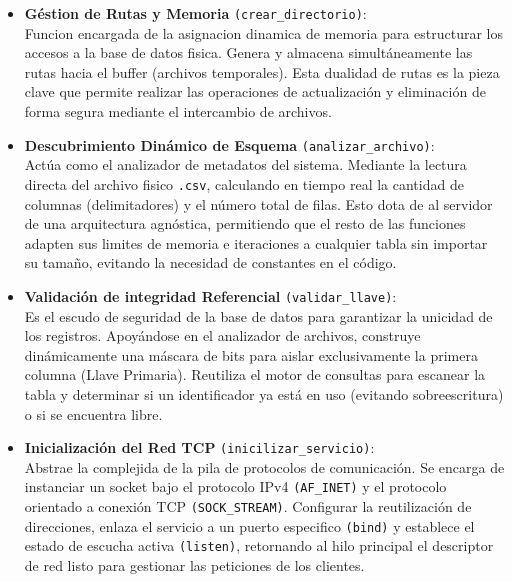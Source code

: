 \documentclass[12pt]{article}
\begin{document}
\begin{itemize}
    \item \textbf{Géstion de Rutas y Memoria} \texttt{(crear\_directorio)}: \\
    Funcion encargada de la asignacion dinamica de memoria para estructurar los accesos a la base de datos fisica. Genera y almacena simultáneamente las rutas hacia el buffer (archivos temporales). Esta dualidad de rutas es la pieza clave que permite realizar las operaciones de actualización y eliminación de forma segura mediante el intercambio de archivos.
    \item \textbf{Descubrimiento Dinámico de Esquema} \texttt{(analizar\_archivo)}:\\
    Actúa como el analizador de metadatos del sistema. Mediante la lectura directa del archivo fisico \texttt{.csv}, calculando en tiempo real la cantidad de columnas (delimitadores) y el número total de filas. Esto dota de al servidor de una arquitectura agnóstica, permitiendo que el resto de las funciones adapten sus limites de memoria e iteraciones a cualquier tabla sin importar su tamaño, evitando la necesidad de constantes en el código.
    \item \textbf{Validación de integridad Referencial} \texttt{(validar\_llave)}: \\
    Es el escudo de seguridad de la base de datos para garantizar la unicidad de los registros. Apoyándose en el analizador de archivos, construye dinámicamente una máscara de bits para aislar exclusivamente la primera columna (Llave Primaria). Reutiliza el motor de consultas para escanear la tabla y determinar si un identificador ya está en uso (evitando sobreescritura) o si se encuentra libre.
    \item \textbf{Inicialización del Red TCP} \texttt{(inicilizar\_servicio)}: \\
    Abstrae la complejida de la pila de protocolos de comunicación. Se encarga de instanciar un socket bajo el protocolo IPv4 \texttt{(AF\_INET)} y el protocolo orientado a conexión TCP \texttt{(SOCK\_STREAM)}. Configurar la reutilización de direcciones, enlaza el servicio a un puerto especifico \texttt{(bind)} y establece el estado de escucha activa \texttt{(listen)}, retornando al hilo principal el descriptor de red listo para gestionar las peticiones de los clientes.
\end{itemize}
\end{document}
